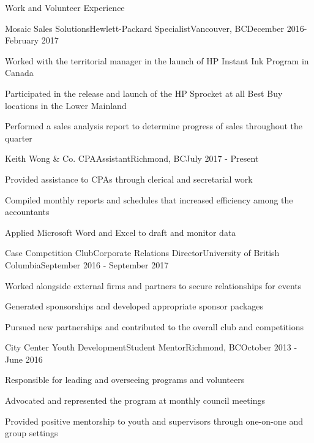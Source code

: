 \documentclass{article}
\newlength{\tabin}
\newlength{\secsep}
\newcommand{\lineunder}{\vspace*{-8pt} \\ \hspace*{-6pt} \hrulefill \\ \vspace*{-15pt}}
\newenvironment{tabbedsection}[1]{
  \begin{list}{}{
      \setlength{\itemsep}{0pt}
      \setlength{\labelsep}{0pt}
      \setlength{\labelwidth}{0pt}
      \setlength{\leftmargin}{\tabin}
      \setlength{\rightmargin}{\tabin}
      \setlength{\listparindent}{0pt}
      \setlength{\parsep}{0pt}
      \setlength{\parskip}{0pt}
      \setlength{\partopsep}{0pt}
      \setlength{\topsep}{#1}
    }
  \item[]
}{\end{list}}
\newenvironment{resume_section}[1]{
  \filbreak
  \vspace{2\secsep}
  \textsc{\large#1}
  \lineunder
  \begin{tabbedsection}{\secsep}
}{\end{tabbedsection}}
\newenvironment{subitems}{
  \renewcommand{\labelitemi}{-}
  \begin{itemize}
      \setlength{\labelsep}{1em}
}{\end{itemize}}
\newenvironment{resume_employer}[4]{
  \vspace{\secsep}
  \textbf{#1} \\
  \indent {\small #2} \hfill {\footnotesize#3 (#4)}
  \begin{tabbedsection}{0pt}
  \begin{subitems}
}{\end{subitems}\end{tabbedsection}}
\begin{document}
\begin{resume_section}{Work and Volunteer Experience}
  \begin{resume_employer}{Mosaic Sales Solutions}{Hewlett-Packard Specialist}{Vancouver, BC}{December 2016-February 2017}
    \item Worked with the territorial manager in the launch of HP Instant Ink Program in Canada
    \item Participated in the release and launch of the HP Sprocket at all Best Buy locations in the Lower Mainland
    \item Performed a sales analysis report to determine progress of sales throughout the quarter
  \end{resume_employer}

  \begin{resume_employer}{Keith Wong \& Co. CPA}{Assistant}{Richmond, BC}{July 2017 - Present}
    \item Provided assistance to CPAs through clerical and secretarial work
    \item Compiled monthly reports and schedules that increased efficiency among the accountants
    \item Applied Microsoft Word and Excel to draft and monitor data
  \end{resume_employer}

  \begin{resume_employer}{Case Competition Club}{Corporate Relations Director}{University of British Columbia}{September 2016 - September 2017}
    \item Worked alongside external firms and partners to secure relationships for events
    \item Generated sponsorships and developed appropriate sponsor packages
    \item Pursued new partnerships and contributed to the overall club and competitions
  \end{resume_employer}

  \begin{resume_employer}{City Center Youth Development}{Student Mentor}{Richmond, BC}{October 2013 - June 2016}
    \item Responsible for leading and overseeing programs and volunteers
    \item Advocated and represented the program at monthly council meetings
    \item Provided positive mentorship to youth and supervisors through one-on-one and group settings
  \end{resume_employer}
\end{resume_section}
\end{document}
